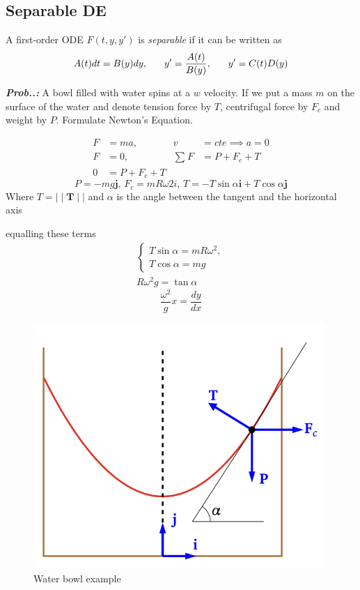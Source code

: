 \documentclass[a4paper]{article}
\begin{document}
\subsection{Separable DE}
A first-order ODE $F(t,y,y')$ is \textit{separable} if it can be written as
$$
A(t)dt=B(y)dy,\hspace{4ex}y'=\frac{A(t)}{B(y)},\hspace{4ex}y'=C(t)D(y)
$$

\vspace{2ex}\textit{\textbf{Prob.\thesection.\theprob:}} A bowl filled with water spins at a $w$ velocity. If we put a mass $m$ on the surface of the water and denote tension force by $T$, centrifugal force by $F_{c}$ and weight by $P$. Formulate Newton's Equation.

\begin{align}
F&=ma, & v&=cte\implies a=0 \\
F&=0, & \sum^{}_{}F&=P+F_{c}+T \\
0&= P+F_{c}+T
\end{align}
$$
P=-mg\mathbf{j},\, F_{c}=mR\omega 2i,\, T=-T\sin \alpha \mathbf{i} + T\cos \alpha \mathbf{j}
$$
Where $T=\mid\mid \mathbf{T}\mid\mid$ and $\alpha$ is the angle between the tangent and the horizontal axis

\begin{minipage}{0.4\textwidth}
equalling these terms
\begin{align}
\begin{cases}
T\sin \alpha=mR\omega^{2}, \\
T\cos \alpha=mg
\end{cases} \\
R\omega^{2}g=\tan \alpha
\end{align}
$$
\boxed{\frac{\omega^{2}}{g}x=\frac{dy}{dx}}
$$
\end{minipage} \hfill \begin{minipage}{0.4\linewidth}
\begin{figure}[H]
    \centering
    \includegraphics[width=\textwidth]{IMG/ex_water.png}
    \caption{Water bowl example}
    \label{fig:ex_water}
\end{figure}
\end{minipage}
\end{document}
